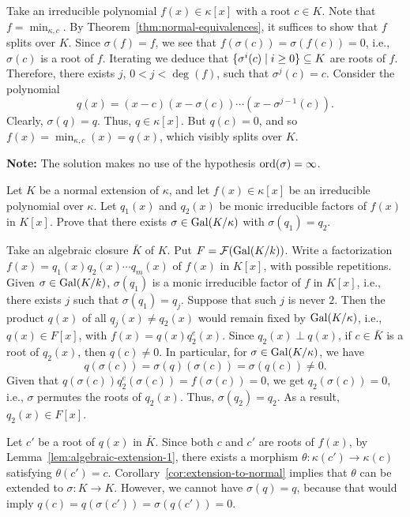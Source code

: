 \begin{solution}
    Take an irreducible polynomial $f(x)\in\kappa[x]$ with a root $c\in K$. Note that $f=\min_{\kappa,c}$. By Theorem~\ref{thm:normal-equivalences}, it suffices to show that $f$ splits over $K$. Since $\sigma(f)=f$, we see that $f(\sigma(c))=\sigma(f(c))=0$, i.e., $\sigma(c)$ is a root of $f$. Iterating we deduce that $\{\sigma^i(c)\mid i\ge0\}\subseteq K$ are roots of $f$. Therefore, there exists $j$, $0<j<\deg(f)$, such that $\sigma^j(c)=c$. Consider the polynomial
    $$
        q(x) = (x-c)(x-\sigma(c))\cdots(x-\sigma^{j-1}(c)).
    $$
    Clearly, $\sigma(q)=q$. Thus, $q\in\kappa[x]$. But $q(c)=0$, and so $f(x)=\min_{\kappa,c}(x)=q(x)$, which visibly splits over $K$.

    \textbf{Note:} The solution makes no use of the hypothesis ${\rm ord}(\sigma)=\infty$.
\end{solution}

\begin{probl}\label{probl:normal-equivalence-prep}
    Let\/ $K$ be a normal extension of\/ $\kappa$, and let\/ $f(x) \in \kappa[x]$ be an irreducible polynomial over\/ $\kappa$. Let\/ $q_1(x)$ and\/ $q_2(x)$ be monic irreducible factors of\/ $f(x)$ in\/ $K[x]$. Prove that there exists\/ $\sigma \in \operatorname{Gal}(K / \kappa)$ with\/ $\sigma(q_1) = q_2$.
\end{probl}

\begin{solution}
    Take an algebraic closure $\bar K$ of $K$. Put $F=\mathcal F(\operatorname{Gal}(K/k))$. Write a factorization $f(x)=q_1(x)q_2(x)\cdots q_m(x)$ of $f(x)$ in $K[x]$, with possible repetitions. Given $\sigma\in\operatorname{Gal}(K/k)$, $\sigma(q_1)$ is a monic irreducible factor of $f$ in $K[x]$, i.e., there exists $j$ such that $\sigma(q_1)=q_j$. Suppose that such $j$ is never $2$. Then the product $q(x)$ of all $q_j(x)\ne q_2(x)$ would remain fixed by $\operatorname{Gal}(K/\kappa)$, i.e., $q(x)\in F[x]$, with $f(x)=q(x)q_2^e(x)$. Since $q_2(x)\perp q(x)$, if $c\in\bar K$ is a root of $q_2(x)$, then $q(c)\ne0$. In particular, for $\sigma\in\operatorname{Gal}(K/\kappa)$, we have
    $$
        q(\sigma(c)) = \sigma(q)(\sigma(c))=\sigma(q(c))\ne0.
    $$
    Given that $q(\sigma(c))q_2^ e(\sigma(c))=f(\sigma(c))=0$, we get $q_2(\sigma(c))=0$, i.e., $\sigma$ permutes the roots of $q_2(x)$. Thus, $\sigma(q_2)=q_2$. As a result, $q_2(x)\in F[x]$.

    Let $c'$ be a root of $q(x)$ in $\bar K$. Since both $c$ and $c'$ are roots of $f(x)$, by Lemma~\ref{lem:algebraic-extension-1}, there exists a morphism $\theta\colon\kappa(c')\to\kappa(c)$ satisfying $\theta(c')=c$. Corollary~\ref{cor:extension-to-normal} implies that $\theta$ can be extended to $\sigma\colon K\to K$. However, we cannot have $\sigma(q)=q$, because that would imply $q(c)=q(\sigma(c'))=\sigma(q(c'))=0$.
    
\end{solution}

